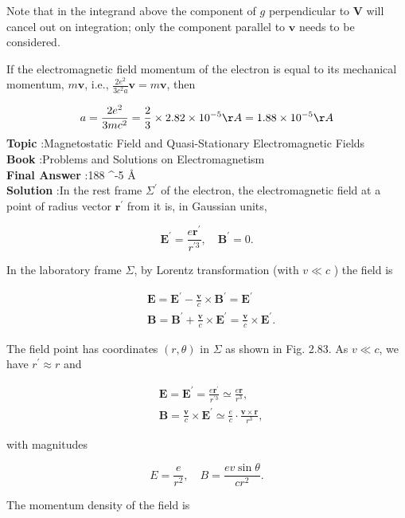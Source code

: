 \documentclass[10pt]{article}
\begin{document}
Note that in the integrand above the component of $g$ perpendicular to $\mathbf{V}$ will cancel out on integration; only the component parallel to $\mathbf{v}$ needs to be considered.

If the electromagnetic field momentum of the electron is equal to its mechanical momentum, $m \mathbf{v}$, i.e., $\frac{2 e^{2}}{3 c^{2} a} \mathbf{v}=m \mathbf{v}$, then

$$
a=\frac{2 e^{2}}{3 m c^{2}}=\frac{2}{3} \times 2.82 \times 10^{-5} \AA=1.88 \times 10^{-5} \AA
$$
\textbf{Topic} :Magnetostatic Field and Quasi-Stationary Electromagnetic Fields\\
\textbf{Book} :Problems and Solutions on Electromagnetism\\
\textbf{Final Answer} :188 ^{-5} \AA\\


\textbf{Solution} :In the rest frame $\Sigma^{\prime}$ of the electron, the electromagnetic field at a point of radius vector $\mathbf{r}^{\prime}$ from it is, in Gaussian units,

$$
\mathbf{E}^{\prime}=\frac{e \mathbf{r}^{\prime}}{r^{\prime 3}}, \quad \mathbf{B}^{\prime}=0 .
$$

In the laboratory frame $\Sigma$, by Lorentz transformation (with $v \ll c$ ) the field is

$$
\begin{aligned}
&\mathbf{E}=\mathbf{E}^{\prime}-\frac{\mathbf{v}}{c} \times \mathbf{B}^{\prime}=\mathbf{E}^{\prime} \\
&\mathbf{B}=\mathbf{B}^{\prime}+\frac{\mathbf{v}}{c} \times \mathbf{E}^{\prime}=\frac{\mathbf{v}}{c} \times \mathbf{E}^{\prime} .
\end{aligned}
$$

The field point has coordinates $(r, \theta)$ in $\Sigma$ as shown in Fig. 2.83. As $v \ll c$, we have $r^{\prime} \approx r$ and

$$
\begin{aligned}
&\mathbf{E}=\mathbf{E}^{\prime}=\frac{e \mathbf{r}^{\prime}}{r^{\prime 3}} \simeq \frac{e \mathbf{r}}{r^{3}}, \\
&\mathbf{B}=\frac{\mathbf{v}}{c} \times \mathbf{E}^{\prime} \simeq \frac{e}{c} \cdot \frac{\mathbf{v} \times \mathbf{r}}{r^{3}},
\end{aligned}
$$

with magnitudes

$$
E=\frac{e}{r^{2}}, \quad B=\frac{e v \sin \theta}{c r^{2}} .
$$

 The momentum density of the field is
\end{document}
